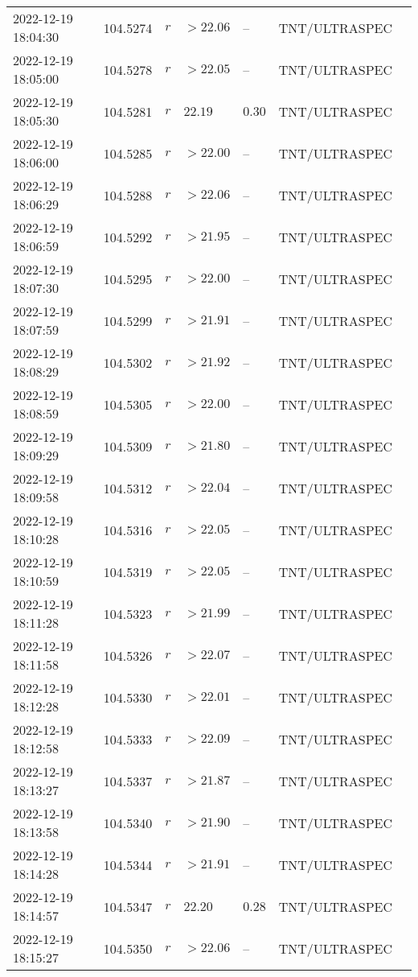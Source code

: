 \documentclass{nature_plusfigure}
\begin{document}
\begin{supplement}
\begin{center}
\begin{longtable}{lllllll}
2022-12-19 18:04:30 & 104.5274 & $r$ & $>22.06$ & -- & TNT/ULTRASPEC &  \\ 
2022-12-19 18:05:00 & 104.5278 & $r$ & $>22.05$ & -- & TNT/ULTRASPEC &  \\ 
2022-12-19 18:05:30 & 104.5281 & $r$ & $22.19$ & $0.30$ & TNT/ULTRASPEC &  \\ 
2022-12-19 18:06:00 & 104.5285 & $r$ & $>22.00$ & -- & TNT/ULTRASPEC &  \\ 
2022-12-19 18:06:29 & 104.5288 & $r$ & $>22.06$ & -- & TNT/ULTRASPEC &  \\ 
2022-12-19 18:06:59 & 104.5292 & $r$ & $>21.95$ & -- & TNT/ULTRASPEC &  \\ 
2022-12-19 18:07:30 & 104.5295 & $r$ & $>22.00$ & -- & TNT/ULTRASPEC &  \\ 
2022-12-19 18:07:59 & 104.5299 & $r$ & $>21.91$ & -- & TNT/ULTRASPEC &  \\ 
2022-12-19 18:08:29 & 104.5302 & $r$ & $>21.92$ & -- & TNT/ULTRASPEC &  \\ 
2022-12-19 18:08:59 & 104.5305 & $r$ & $>22.00$ & -- & TNT/ULTRASPEC &  \\ 
2022-12-19 18:09:29 & 104.5309 & $r$ & $>21.80$ & -- & TNT/ULTRASPEC &  \\ 
2022-12-19 18:09:58 & 104.5312 & $r$ & $>22.04$ & -- & TNT/ULTRASPEC &  \\ 
2022-12-19 18:10:28 & 104.5316 & $r$ & $>22.05$ & -- & TNT/ULTRASPEC &  \\ 
2022-12-19 18:10:59 & 104.5319 & $r$ & $>22.05$ & -- & TNT/ULTRASPEC &  \\ 
2022-12-19 18:11:28 & 104.5323 & $r$ & $>21.99$ & -- & TNT/ULTRASPEC &  \\ 
2022-12-19 18:11:58 & 104.5326 & $r$ & $>22.07$ & -- & TNT/ULTRASPEC &  \\ 
2022-12-19 18:12:28 & 104.5330 & $r$ & $>22.01$ & -- & TNT/ULTRASPEC &  \\ 
2022-12-19 18:12:58 & 104.5333 & $r$ & $>22.09$ & -- & TNT/ULTRASPEC &  \\ 
2022-12-19 18:13:27 & 104.5337 & $r$ & $>21.87$ & -- & TNT/ULTRASPEC &  \\ 
2022-12-19 18:13:58 & 104.5340 & $r$ & $>21.90$ & -- & TNT/ULTRASPEC &  \\ 
2022-12-19 18:14:28 & 104.5344 & $r$ & $>21.91$ & -- & TNT/ULTRASPEC &  \\ 
2022-12-19 18:14:57 & 104.5347 & $r$ & $22.20$ & $0.28$ & TNT/ULTRASPEC &  \\ 
2022-12-19 18:15:27 & 104.5350 & $r$ & $>22.06$ & -- & TNT/ULTRASPEC &  \\ 

\end{longtable}
\end{center}
\end{supplement}
\end{document}

